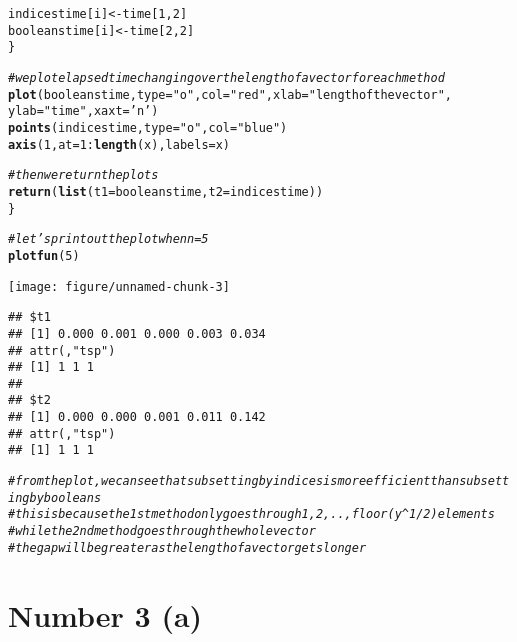 \documentclass[english]{article}\usepackage[]{graphicx}\usepackage[]{color}
\makeatletter
\def\maxwidth{ %
  \ifdim\Gin@nat@width>\linewidth
    \linewidth
  \else
    \Gin@nat@width
  \fi
}
\newcommand{\hlnum}[1]{\textcolor[rgb]{0.686,0.059,0.569}{#1}}%
\newcommand{\hlstr}[1]{\textcolor[rgb]{0.192,0.494,0.8}{#1}}%
\newcommand{\hlcom}[1]{\textcolor[rgb]{0.678,0.584,0.686}{\textit{#1}}}%
\newcommand{\hlopt}[1]{\textcolor[rgb]{0,0,0}{#1}}%
\newcommand{\hlstd}[1]{\textcolor[rgb]{0.345,0.345,0.345}{#1}}%
\newcommand{\hlkwb}[1]{\textcolor[rgb]{0.69,0.353,0.396}{#1}}%
\newcommand{\hlkwc}[1]{\textcolor[rgb]{0.333,0.667,0.333}{#1}}%
\newcommand{\hlkwd}[1]{\textcolor[rgb]{0.737,0.353,0.396}{\textbf{#1}}}%
\newenvironment{kframe}{%
 \def\at@end@of@kframe{}%
 \ifinner\ifhmode%
  \def\at@end@of@kframe{\end{minipage}}%
  \begin{minipage}{\columnwidth}%
 \fi\fi%
 \def\FrameCommand##1{\hskip\@totalleftmargin \hskip-\fboxsep
 \colorbox{shadecolor}{##1}\hskip-\fboxsep
     \hskip-\linewidth \hskip-\@totalleftmargin \hskip\columnwidth}%
 \MakeFramed {\advance\hsize-\width
   \@totalleftmargin\z@ \linewidth\hsize
   \@setminipage}}%
 {\par\unskip\endMakeFramed%
 \at@end@of@kframe}
\newenvironment{knitrout}{}{} %
\makeatother
\begin{document}
\begin{knitrout}
\begin{kframe}
\begin{alltt}
        \hlstd{indicestime[i]} \hlkwb{<-} \hlstd{time[}\hlnum{1}\hlstd{,}\hlnum{2}\hlstd{]}
        \hlstd{booleanstime[i]} \hlkwb{<-} \hlstd{time[}\hlnum{2}\hlstd{,}\hlnum{2}\hlstd{]}
        \hlstd{\}}

        \hlcom{# we plot elapsed time changing over the length of a vector for each method}
        \hlkwd{plot}\hlstd{(booleanstime,}  \hlkwc{type}\hlstd{=}\hlstr{"o"}\hlstd{,} \hlkwc{col}\hlstd{=}\hlstr{"red"}\hlstd{,} \hlkwc{xlab}\hlstd{=}\hlstr{"length of the vector"}\hlstd{,}
                \hlkwc{ylab}\hlstd{=}\hlstr{"time"}\hlstd{,} \hlkwc{xaxt}\hlstd{=}\hlstr{'n'}\hlstd{)}
        \hlkwd{points}\hlstd{(indicestime,}  \hlkwc{type}\hlstd{=}\hlstr{"o"}\hlstd{,} \hlkwc{col}\hlstd{=}\hlstr{"blue"}\hlstd{)}
        \hlkwd{axis}\hlstd{(}\hlnum{1}\hlstd{,} \hlkwc{at}\hlstd{=}\hlnum{1}\hlopt{:}\hlkwd{length}\hlstd{(x),} \hlkwc{labels}\hlstd{=x)}

        \hlcom{# then we return the plots}
        \hlkwd{return}\hlstd{(}\hlkwd{list}\hlstd{(}\hlkwc{t1}\hlstd{=booleanstime,} \hlkwc{t2}\hlstd{=indicestime))}
\hlstd{\}}

\hlcom{# let's print out the plot when n=5}
\hlkwd{plotfun}\hlstd{(}\hlnum{5}\hlstd{)}
\end{alltt}
\end{kframe}
\texttt{[image: figure/unnamed-chunk-3]} 
\begin{kframe}\begin{verbatim}
## $t1
## [1] 0.000 0.001 0.000 0.003 0.034
## attr(,"tsp")
## [1] 1 1 1
## 
## $t2
## [1] 0.000 0.000 0.001 0.011 0.142
## attr(,"tsp")
## [1] 1 1 1
\end{verbatim}
\begin{alltt}
\hlcom{# from the plot, we can see that subsetting by indices is more efficient than subsetting by booleans}
\hlcom{# this is because the 1st method only goes through 1,2,..,floor(y^1/2) elements}
\hlcom{# while the 2nd method goes through the whole vector}
\hlcom{# the gap will be greater as the length of a vector gets longer}
\end{alltt}
\end{kframe}
\end{knitrout}


\section*{Number 3 (a)}
\end{document}

